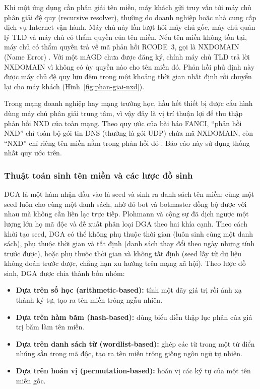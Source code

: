 

Khi một ứng dụng cần phân giải tên miền, máy khách gửi truy vấn tới máy chủ phân giải đệ quy (recursive resolver), thường do doanh nghiệp hoặc nhà cung cấp dịch vụ Internet vận hành. Máy chủ này lần lượt hỏi máy chủ gốc, máy chủ quản lý TLD và máy chủ có thẩm quyền của tên miền. Nếu tên miền không tồn tại, máy chủ có thẩm quyền trả về mã phản hồi RCODE~3, gọi là NXDOMAIN (Name Error) \cite{rfc1035}. Với một mAGD chưa được đăng ký, chính máy chủ TLD trả lời NXDOMAIN vì không có ủy quyền nào cho tên miền đó. Phản hồi phủ định này được máy chủ đệ quy lưu đệm trong một khoảng thời gian nhất định \cite{rfc2308} rồi chuyển lại cho máy khách (Hình~\ref{fig:phan-giai-nxd}).



Trong mạng doanh nghiệp hay mạng trường học, hầu hết thiết bị được cấu hình dùng máy chủ phân giải trung tâm, vì vậy đây là vị trí thuận lợi để thu thập phản hồi NXD của toàn mạng. Theo quy ước của bài báo FANCI, ``phản hồi NXD'' chỉ toàn bộ gói tin DNS (thường là gói UDP) chứa mã NXDOMAIN, còn ``NXD'' chỉ riêng tên miền nằm trong phản hồi đó \cite{schuppen2018fanci}. Báo cáo này sử dụng thống nhất quy ước trên.

\subsubsection{Thuật toán sinh tên miền và các lược đồ sinh}\label{sec:dga-luoc-do}

DGA là một hàm nhận đầu vào là seed và sinh ra danh sách tên miền; cùng một seed luôn cho cùng một danh sách, nhờ đó bot và botmaster đồng bộ được với nhau mà không cần liên lạc trực tiếp. Plohmann và cộng sự \cite{plohmann2016dga} đã dịch ngược một lượng lớn họ mã độc và đề xuất phân loại DGA theo hai khía cạnh. Theo cách khởi tạo seed, DGA có thể không phụ thuộc thời gian (luôn sinh cùng một danh sách), phụ thuộc thời gian và tất định (danh sách thay đổi theo ngày nhưng tính trước được), hoặc phụ thuộc thời gian và không tất định (seed lấy từ dữ liệu không đoán trước được, chẳng hạn xu hướng trên mạng xã hội). Theo lược đồ sinh, DGA được chia thành bốn nhóm:
\begin{itemize}
    \item \textbf{Dựa trên số học (arithmetic-based):} tính một dãy giá trị rồi ánh xạ thành ký tự, tạo ra tên miền trông ngẫu nhiên.
    \item \textbf{Dựa trên hàm băm (hash-based):} dùng biểu diễn thập lục phân của giá trị băm làm tên miền.
    \item \textbf{Dựa trên danh sách từ (wordlist-based):} ghép các từ trong một từ điển nhúng sẵn trong mã độc, tạo ra tên miền trông giống ngôn ngữ tự nhiên.
    \item \textbf{Dựa trên hoán vị (permutation-based):} hoán vị các ký tự của một tên miền gốc.
\end{itemize}

